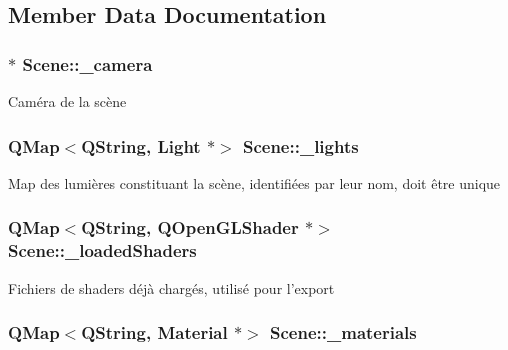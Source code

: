 \subsection{Member Data Documentation}
\hypertarget{class_scene_a8cce9e0f96edc8655a9b9a885e2c26bf}{
\subsubsection[{\+\_\+camera}]{$\ast$ Scene\+::\+\_\+camera}}\label{class_scene_a8cce9e0f96edc8655a9b9a885e2c26bf}
Caméra de la scène \hypertarget{class_scene_a0ef33120973d6afc1754d2154d7c338a}{
\subsubsection[{\+\_\+lights}]{\setlength{\rightskip}{0pt plus 5cm}Q\+Map$<$Q\+String, {\bf Light} $\ast$$>$ Scene\+::\+\_\+lights\hspace{0.3cm}{\ttfamily [private]}}}\label{class_scene_a0ef33120973d6afc1754d2154d7c338a}
Map des lumières constituant la scène, identifiées par leur nom, doit être unique \hypertarget{class_scene_a57117e4269465f070fb412f338d28bf4}{
\subsubsection[{\+\_\+loaded\+Shaders}]{\setlength{\rightskip}{0pt plus 5cm}Q\+Map$<$Q\+String, Q\+Open\+G\+L\+Shader $\ast$$>$ Scene\+::\+\_\+loaded\+Shaders\hspace{0.3cm}{\ttfamily [private]}}}\label{class_scene_a57117e4269465f070fb412f338d28bf4}
Fichiers de shaders déjà chargés, utilisé pour l'export \hypertarget{class_scene_a5b96810fdeb47632d5ce6c2c47f41691}{
\subsubsection[{\+\_\+materials}]{\setlength{\rightskip}{0pt plus 5cm}Q\+Map$<$Q\+String, {\bf Material} $\ast$$>$ Scene\+::\+\_\+materials\hspace{0.3cm}{\ttfamily [private]}}}\label{class_scene_a5b96810fdeb47632d5ce6c2c47f41691}
